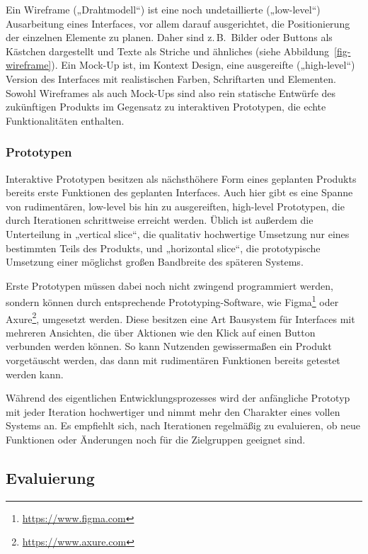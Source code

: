 \documentclass[
  11pt,
  letterpaper,
  DIV=11,
  twoside]{scrreprt}
\DeclareRobustCommand{\href}[2]{#2\footnote{\url{#1}}}
\begin{document}
Ein Wireframe („Drahtmodell``) ist eine noch undetaillierte
(„low-level``) Ausarbeitung eines Interfaces, vor allem darauf
ausgerichtet, die Positionierung der einzelnen Elemente zu planen. Daher
sind z.\,B.~Bilder oder Buttons als Kästchen dargestellt und Texte als
Striche und ähnliches (siehe Abbildung~\ref{fig-wireframe}). Ein Mock-Up
ist, im Kontext Design, eine ausgereifte („high-level``) Version des
Interfaces mit realistischen Farben, Schriftarten und Elementen. Sowohl
Wireframes als auch Mock-Ups sind also rein statische Entwürfe des
zukünftigen Produkts im Gegensatz zu interaktiven Prototypen, die echte
Funktionalitäten enthalten.

\subsubsection{Prototypen}\label{prototypen}

Interaktive Prototypen besitzen als nächsthöhere Form eines geplanten
Produkts bereits erste Funktionen des geplanten Interfaces. Auch hier
gibt es eine Spanne von rudimentären, low-level bis hin zu ausgereiften,
high-level Prototypen, die durch Iterationen schrittweise erreicht
werden. Üblich ist außerdem die Unterteilung in „vertical slice``, die
qualitativ hochwertige Umsetzung nur eines bestimmten Teils des
Produkts, und „horizontal slice``, die prototypische Umsetzung einer
möglichst großen Bandbreite des späteren Systems.

Erste Prototypen müssen dabei noch nicht zwingend programmiert werden,
sondern können durch entsprechende Prototyping-Software, wie
\href{https://www.figma.com}{Figma} oder
\href{https://www.axure.com}{Axure}, umgesetzt werden. Diese besitzen
eine Art Bausystem für Interfaces mit mehreren Ansichten, die über
Aktionen wie den Klick auf einen Button verbunden werden können. So kann
Nutzenden gewissermaßen ein Produkt vorgetäuscht werden, das dann mit
rudimentären Funktionen bereits getestet werden kann.

Während des eigentlichen Entwicklungsprozesses wird der anfängliche
Prototyp mit jeder Iteration hochwertiger und nimmt mehr den Charakter
eines vollen Systems an. Es empfiehlt sich, nach Iterationen regelmäßig
zu evaluieren, ob neue Funktionen oder Änderungen noch für die
Zielgruppen geeignet sind.

\subsection{Evaluierung}\label{evaluierung}
\end{document}
